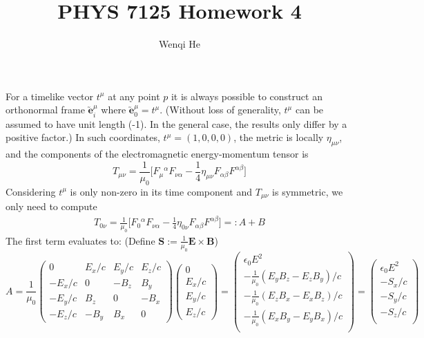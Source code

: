 \documentclass{article}
\title{PHYS 7125 Homework 4}
\author{Wenqi He}
\begin{document}
\maketitle
\section{}
For a timelike vector $t^\mu$ at any point $p$ it is always possible to construct an orthonormal frame $\utilde{\mathbf{e}}_i^\mu$  where $\utilde{\mathbf{e}}_0^\mu= t^\mu$. (Without loss of generality, $t^\mu$ can be assumed to have unit length (-1). In the general case, the results only differ by a positive factor.) In such coordinates, $t^\mu = (1,0,0,0)$, the metric is locally $\eta_{\mu\nu}$, and the components of the electromagnetic energy-momentum tensor is
\[ T_{\mu\nu} = \frac{1}{\mu_0}\Big[ F_\mu{}^\alpha F_{\nu\alpha} - \frac{1}{4}\eta_{\mu\nu}F_{\alpha\beta}F^{\alpha\beta} \Big] \]
Considering $t^\mu$ is only non-zero in its time component and $T_{\mu\nu}$ is symmetric, we only need to compute
\begin{align*}
T_{0\nu} = \frac{1}{\mu_0}\Big[ F_0{}^\alpha F_{\nu\alpha} - \frac{1}{4}\eta_{0\nu}F_{\alpha\beta}F^{\alpha\beta} \Big] =: A+ B 
\end{align*}
The first term evaluates to: (Define $\mathbf{S} := \frac{1}{\mu_0}\mathbf{E} \times \mathbf{B}$)
\[
	A = \frac{1}{\mu_0} \begin{pmatrix}
		0 & E_x/c & E_y/c & E_z/c \\
		-E_x/c & 0 & -B_z & B_y \\
		-E_y/c & B_z & 0 & -B_x \\
		-E_z/c & -B_y & B_x & 0
	\end{pmatrix} \begin{pmatrix}
		0 \\ E_x/c \\ E_y/c \\ E_z/c
	\end{pmatrix} = \begin{pmatrix}
		\epsilon_0 E^2 \\
		-\frac{1}{\mu_0}(E_yB_z - E_zB_y)/c \\
		-\frac{1}{\mu_0}(E_zB_x - E_xB_z)/c \\
		-\frac{1}{\mu_0}(E_xB_y - E_yB_x)/c \\
	\end{pmatrix} = \begin{pmatrix}
		\epsilon_0 E^2 \\
		-S_x/c \\
		-S_y/c \\
		-S_z/c \\
	\end{pmatrix}
\]
\end{document}
